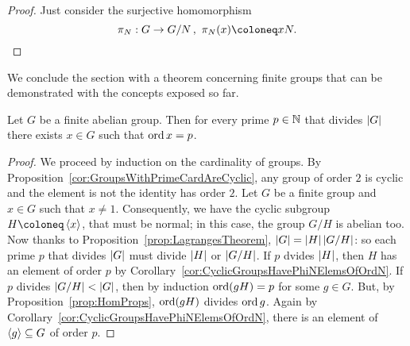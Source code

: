\begin{proof}
Just consider the surjective homomorphism
\[\pi_N : G \to G/N\,, \ \pi_N(x) \coloneq xN .\qedhere\]
\end{proof}

We conclude the section with a theorem concerning finite groups that can be demonstrated with the concepts exposed so far.

\begin{proposition}\label{prop:PreCauchysTheorem}
Let \(G\) be a finite abelian group. Then for every prime \(p \in \mathbb N\) that divides \(\left\lvert G\right\rvert\) there exists \(x \in G\) such that \(\operatorname{ord} x = p\).
\end{proposition}

\begin{proof}
We proceed by induction on the cardinality of groups. By Proposition~\ref{cor:GroupsWithPrimeCardAreCyclic}, any group of order \(2\) is cyclic and the element is not the identity has order \(2\). Let \(G\) be a finite group and \(x \in G\) such that \(x \ne 1\). Consequently, we have the cyclic subgroup \(H \coloneq \gen x\), that must be normal; in this case, the group \(G/H\) is abelian too. Now thanks to Proposition~\ref{prop:LagrangesTheorem}, \(\left\lvert G\right\rvert = \left\lvert H\right\rvert \left\lvert G/H\right\rvert\): so each prime \(p\) that divides \(\left\lvert G\right\rvert\) must divide \(\left\lvert H\right\rvert\) or \(\left\lvert G/H\right\rvert\). If \(p\) dvides \(\left\lvert H\right\rvert\), then \(H\) has an element of order \(p\) by Corollary~\ref{cor:CyclicGroupsHavePhiNElemsOfOrdN}. If \(p\) divides \(\left\lvert G/H\right\rvert < \left\lvert G\right\rvert\), then by induction \(\operatorname{ord} (gH) = p\) for some \(g \in G\). But, by Proposition~\ref{prop:HomProps}, \(\operatorname{ord} (gH)\) divides \(\operatorname{ord} g\). Again by Corollary~\ref{cor:CyclicGroupsHavePhiNElemsOfOrdN}, there is an element of \(\left\langle g\right\rangle \subseteq G\) of order \(p\).
\end{proof}

